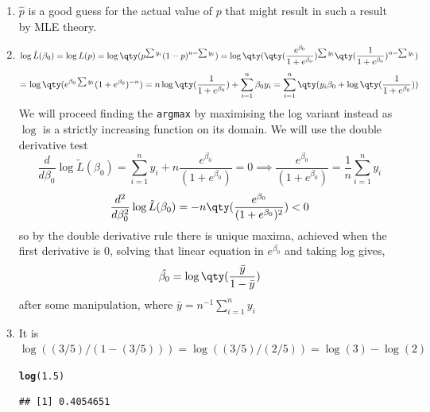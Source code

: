 \documentclass[12pt,english]{article}\usepackage[]{graphicx}\usepackage[]{xcolor}
\makeatletter
\newcommand{\hlnum}[1]{\textcolor[rgb]{0.686,0.059,0.569}{#1}}%
\newcommand{\hldef}[1]{\textcolor[rgb]{0.345,0.345,0.345}{#1}}%
\newcommand{\hlkwd}[1]{\textcolor[rgb]{0.737,0.353,0.396}{\textbf{#1}}}%
\newenvironment{kframe}{%
 \def\at@end@of@kframe{}%
 \ifinner\ifhmode%
  \def\at@end@of@kframe{\end{minipage}}%
  \begin{minipage}{\columnwidth}%
 \fi\fi%
 \def\FrameCommand##1{\hskip\@totalleftmargin \hskip-\fboxsep
 \colorbox{shadecolor}{##1}\hskip-\fboxsep
     \hskip-\linewidth \hskip-\@totalleftmargin \hskip\columnwidth}%
 \MakeFramed {\advance\hsize-\width
   \@totalleftmargin\z@ \linewidth\hsize
   \@setminipage}}%
 {\par\unskip\endMakeFramed%
 \at@end@of@kframe}
\newenvironment{knitrout}{}{} %
\makeatother
\begin{document}
\begin{enumerate}[label=\arabic*.]
\begin{enumerate}[label=(\alph*)]
\begin{knitrout}
\begin{kframe}
\begin{verbatim}
## [1] 0.6000006
\end{verbatim}
\end{kframe}
\end{knitrout}
	\item $\hat{p}$ is a good guess for the actual value of $p$ that might result in such a result by MLE theory.
	\item
		\[
			\log\tilde{L}(\beta_0)=\log L(p)=\log\qty(p^{\sum y_i}(1-p)^{n-\sum y_i})=\log\qty(\qty( \frac{e^{\beta_0}}{1+e^{\beta_0}})^{\sum y_i}\qty( \frac{1}{1+e^{\beta_0}})^{n-\sum y_i})
		\]
		\[
			=\log\qty(e^{\beta_0\sum y_i}(1+e^{\beta_0})^{-n})=n\log\qty( \frac{1}{1+e^{\beta_0}})+\sum_{i=1}^n\beta_0y_i=\sum_{i=1}^n\qty(y_i\beta_0+\log\qty( \frac{1}{1+e^{\beta_0}}))
		\]
		We will proceed finding the \texttt{argmax} by maximising the log variant instead as $\log$ is a strictly increasing function on its domain. We will use the double derivative test
		\[
			\frac{d}{d\beta_0}\log\tilde{L}(\beta_0) = \sum_{i=1}^{n}y_i+n\frac{e^{\beta_0}}{(1+e^{\beta_0})}=0\implies \frac{e^{\beta_0}}{(1+e^{\beta_0})} = \frac{1}{n}\sum_{i=1}^ny_i
		\]
		\[
			\frac{d^2}{d\beta_0^2}\log\tilde{L}(\beta_0) = -n\qty( \frac{e^{\beta_0}}{(1+e^{\beta_0})^2})<0
		\]
		so by the double derivative rule there is unique maxima, achieved when the first derivative is $0$, solving that linear equation in $e^{\beta_0}$ and taking log gives,
		\[
			\hat{\beta_0}=\log\qty(\frac{\bar{y}}{1-\bar{y}})
		\]
		after some manipulation, where $\bar{y}=n^{-1}\sum_{i=1}^ny_i$
		\item It is $\log((3/5)/(1-(3/5)))=\log((3/5)/(2/5))=\log(3)-\log(2)$
\begin{knitrout}
\color{fgcolor}\begin{kframe}
\begin{alltt}
\hlkwd{log}\hldef{(}\hlnum{1.5}\hldef{)}
\end{alltt}
\begin{verbatim}
## [1] 0.4054651
\end{verbatim}
\end{kframe}
\end{knitrout}
			

\end{enumerate}
\end{enumerate}
\end{document}
